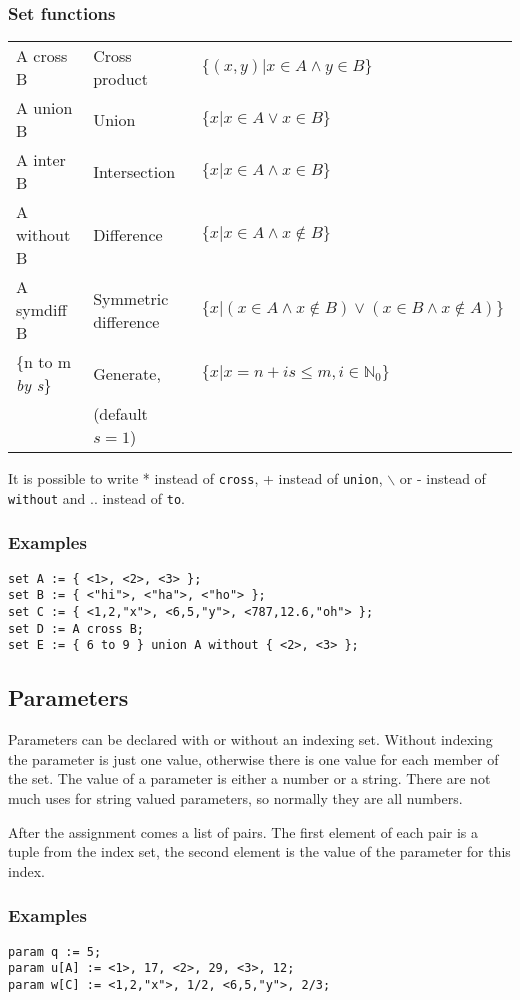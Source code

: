 \documentclass[12pt]{article}
\newcommand{\code}[1]{{\tt #1}\xspace}
\newcommand{\N}{\ensuremath{\mathbb{N}}}
\begin{document}
\subsubsection{Set functions}
\begin{tabular}{lll}
\hline
A cross B   &Cross product & $\{(x,y)| x\in A\wedge y\in B\}$\\
A union B   &Union & $\{x | x\in A\vee x\in B\}$\\
A inter B   &Intersection & $\{x |x\in A\wedge x\in B\}$\\
A without B &Difference & $\{ x |x\in A\wedge x\not\in B\}$\\
A symdiff B &Symmetric difference & 
$\{ x |(x\in A\wedge x\not\in B)\vee(x\in B\wedge x\not\in A)\}$\\
\{n to m {\em by s}\}& Generate, & 
$\{ x | x=n + is \leq m, i\in\N_0\}$\\
&(default $s = 1$)&\\ 
\hline
\end{tabular}

\medskip
It is possible to write 
* instead of \code{cross}, 
+ instead of \code{union},  
$\backslash$ or - instead of \code{without}
and .. instead of \code{to}.  

\subsubsection{Examples}
{\small 
\begin{verbatim}
set A := { <1>, <2>, <3> };
set B := { <"hi">, <"ha">, <"ho"> };
set C := { <1,2,"x">, <6,5,"y">, <787,12.6,"oh"> };
set D := A cross B;
set E := { 6 to 9 } union A without { <2>, <3> }; 
\end{verbatim}
}

\subsection{Parameters}
Parameters can be declared with or without an indexing
set. Without indexing the parameter is just one value, otherwise there is one
value for each member of the set. The value of a parameter is either a
number or a string. There are not much uses for string valued
parameters, so normally they are all numbers. 

After the assignment comes a list of pairs. The first element of each
pair is a tuple from the index set, the second element is the value of
the parameter for this index.

\subsubsection{Examples}
{\small 
\begin{verbatim}
param q := 5;
param u[A] := <1>, 17, <2>, 29, <3>, 12;
param w[C] := <1,2,"x">, 1/2, <6,5,"y">, 2/3;
\end{verbatim}
}
\end{document}
